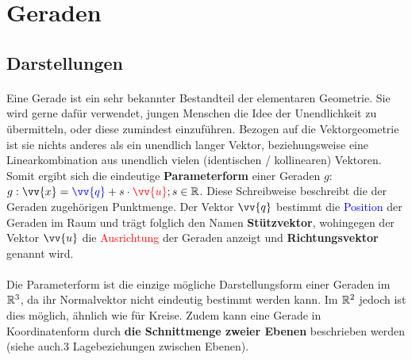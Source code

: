 \section{Geraden}

    \subsection{Darstellungen}

        \paragraph{} Eine Gerade ist ein sehr bekannter Bestandteil der elementaren Geometrie. Sie wird gerne dafür verwendet, jungen Menschen die Idee
        der Unendlichkeit zu übermitteln, oder diese zumindest einzuführen. Bezogen auf die Vektorgeometrie ist sie nichts anderes als ein unendlich
        langer Vektor, beziehungsweise eine Linearkombination aus unendlich vielen (identischen / kollinearen) Vektoren. Somit ergibt sich die eindeutige
        \textbf{Parameterform} einer Geraden $g$: $g:\vv{x}=\textcolor{blue}{\vv{q}}+s\cdot\textcolor{red}{\vv{u}};s\in\R$. Diese Schreibweise beschreibt
        die der Geraden zugehörigen Punktmenge. Der Vektor $\vv{q}$ bestimmt die \textcolor{blue}{Position} der Geraden im Raum und trägt folglich den
        Namen \textbf{Stützvektor}, wohingegen der Vektor $\vv{u}$ die \textcolor{red}{Ausrichtung} der Geraden anzeigt und \textbf{Richtungsvektor}
        genannt wird.
        \\
        \begin{Bemerkung}
            \paragraph{} Die Parameterform ist die einzige mögliche Darstellungsform einer Geraden im $\mathbb{R}^3$, da ihr Normalvektor nicht eindeutig bestimmt
            werden kann. Im $\mathbb{R}^2$ jedoch ist dies möglich, ähnlich wie für Kreise. Zudem kann eine Gerade in Koordinatenform durch \textbf{die
            Schnittmenge zweier Ebenen} beschrieben werden (siehe auch.3 Lagebeziehungen zwischen Ebenen\grqq).
        \end{Bemerkung}

